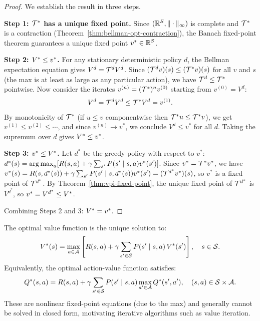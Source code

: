 \documentclass[11pt,a4paper]{article}
\begin{document}
\begin{proof}
We establish the result in three steps.

\textbf{Step 1: $\mathcal{T}^*$ has a unique fixed point.}
Since $(\mathbb{R}^S, \|\cdot\|_\infty)$ is complete and $\mathcal{T}^*$ is
a contraction (Theorem~\ref{thm:bellman-opt-contraction}), the
Banach fixed-point theorem guarantees a unique fixed point
$v^* \in \mathbb{R}^S$.

\textbf{Step 2: $V^* \leq v^*$.}
For any stationary deterministic policy $d$, the Bellman expectation
equation gives $V^d = \mathcal{T}^d V^d$. Since
$(\mathcal{T}^d v)(s) \leq (\mathcal{T}^* v)(s)$ for all $v$ and $s$
(the max is at least as large as any particular action), we have
$\mathcal{T}^d \leq \mathcal{T}^*$ pointwise. Now consider the iterates
$v^{(n)} = (\mathcal{T}^*)^n v^{(0)}$ starting from $v^{(0)} = V^d$:
\begin{align*}
    V^d = \mathcal{T}^d V^d \leq \mathcal{T}^* V^d = v^{(1)}.
\end{align*}
By monotonicity of $\mathcal{T}^*$ (if $u \leq v$ componentwise then
$\mathcal{T}^* u \leq \mathcal{T}^* v$), we get
$v^{(1)} \leq v^{(2)} \leq \cdots$, and since $v^{(n)} \to v^*$,
we conclude $V^d \leq v^*$ for all $d$. Taking the supremum over $d$
gives $V^* \leq v^*$.

\textbf{Step 3: $v^* \leq V^*$.}
Let $d^*$ be the greedy policy with respect to $v^*$:
$d^*(s) = \operatorname{arg\,max}_a [R(s,a) + \gamma \sum_{s'} P(s' \mid s,a)
v^*(s')]$. Since $v^* = \mathcal{T}^* v^*$, we have
$v^*(s) = R(s, d^*(s)) + \gamma \sum_{s'} P(s' \mid s, d^*(s))
v^*(s') = (\mathcal{T}^{d^*} v^*)(s)$, so $v^*$ is a fixed point of
$\mathcal{T}^{d^*}$. By
Theorem~\ref{thm:vpi-fixed-point}, the unique fixed point of
$\mathcal{T}^{d^*}$ is $V^{d^*}$, so $v^* = V^{d^*} \leq V^*$.

Combining Steps 2 and 3: $V^* = v^*$.
\end{proof}

\begin{keyresult}[title={Bellman Optimality Equation}]
The optimal value function is the unique solution to:
\[
    V^*(s) = \max_{a \in \mathcal{A}}
    \left[ R(s,a) + \gamma \sum_{s' \in \mathcal{S}}
    P(s' \mid s,a)\, V^*(s') \right],
    \quad s \in \mathcal{S}.
\]
Equivalently, the optimal action-value function satisfies:
\[
    Q^*(s,a) = R(s,a) + \gamma \sum_{s' \in \mathcal{S}}
    P(s' \mid s,a) \max_{a' \in \mathcal{A}} Q^*(s', a'),
    \quad (s,a) \in \mathcal{S} \times \mathcal{A}.
\]
These are nonlinear fixed-point equations (due to the max) and
generally cannot be solved in closed form, motivating iterative
algorithms such as value iteration.
\end{keyresult}
\end{document}
